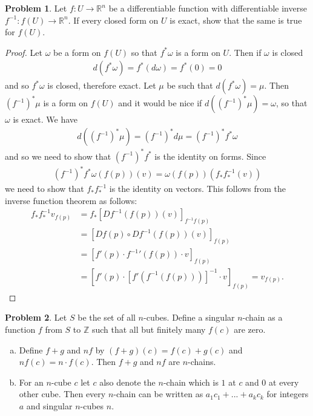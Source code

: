 \documentclass[20pt]{article}
\theoremstyle{plain}
\theoremstyle{definition}
\newtheorem*{problem}{Problem}
\newcommand{\reals}{\mathbb{R}}
\newcommand{\integers}{\mathbb{Z}}
\begin{document}
\begin{problem}{4.20}
  Let $f: U \to \reals^n$ be a differentiable function with differentiable inverse
  $f^{-1}: f(U) \to \reals^n$. If every closed form on $U$ is exact, show that 
  the same is true for $f(U)$.
\end{problem}
\begin{proof}
  Let $\omega$ be a form on $f(U)$ so that $f^*\omega$ is a form on 
  $U$.  Then if $\omega$ is closed
  \begin{align*}
    d(f^*\omega) = f^*(d \omega) = f^*(0) = 0
  \end{align*}
  and so $f^*\omega$ is closed, therefore exact.  Let $\mu$ be such that 
  $d(f^*\omega)= \mu$.
  Then $(f^{-1})^*\mu$ is a form on $f(U)$ and it would be nice if
  $d((f^{-1})^*\mu) = \omega$, so that $\omega$ is exact.  We have 
  \begin{align*}
    d((f^{-1})^*\mu) = (f^{-1})^*d\mu = (f^{-1})^* f^* \omega
  \end{align*}
  and so we need to show that $(f^{-1})^* f^*$ is the identity on forms.
  Since
  \begin{align*}
    (f^{-1})^*f^*\omega(f(p))(v) = \omega(f(p))(f_*f^{-1}_*(v))
  \end{align*}
  we need to show that $f_* f^{-1}_*$ is the identity on vectors.
  This follows from the inverse function theorem as follows:
  \begin{align*}
    f_*f^{-1}_*v_{f(p)} &= 
    f_*[Df^{-1}(f(p))(v)]_{f^{-1}f(p)} \\&= 
    [Df(p)\circ Df^{-1}(f(p))(v)]_{f(p)} \\&=
    [f'(p) \cdot f^{-1}{'}(f(p)) \cdot v ]_{f(p)} \\&=
    [f'(p) \cdot [f'(f^{-1}(f(p)))]^{-1} \cdot v]_{f(p)} = v_{f(p)}.
  \end{align*}
\end{proof}






















\begin{problem}{4.22}
  Let $S$ be the set of all $n$-cubes.  Define a singular $n$-chain as a function
  $f$ from $S$ to $\integers$ such that all but finitely many $f(c)$ are zero.
  \begin{enumerate}[(a)]
    \item 
      Define $f+g$ and $nf$ by $(f+g)(c) = f(c) + g(c)$ and $nf(c) = n \cdot f(c)$.
      Then $f+g$ and $nf$ are $n$-chains.
    \item 
      For an $n$-cube $c$ let $c$ also denote the $n$-chain which 
      is $1$ at $c$ and $0$ at every other cube. 
      Then every $n$-chain can be written as $a_1c_1 + ... + a_kc_k$
      for integers $a$ and singular $n$-cubes $n$.
  \end{enumerate}
\end{problem}
\end{document}
